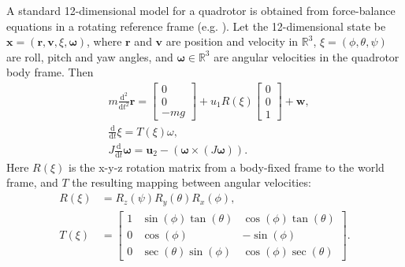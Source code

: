 \documentclass[conference]{IEEEtran}
\begin{document}
A standard 12-dimensional model for a quadrotor is obtained from force-balance equations in a rotating reference frame (e.g. \cite{Mellinger2011,Zhou2014}). Let the 12-dimensional state be $\mathbf{x} = (\mathbf{r}, \mathbf{v}, \xi, \mathbf{\omega})$, where $\mathbf{r}$ and $\mathbf{v}$ are position and velocity in $\mathbb{R}^3$, $\xi = (\phi, \theta, \psi)$ are roll, pitch and yaw angles, and $\mathbf{\omega} \in \mathbb{R}^3$ are angular velocities in the quadrotor body frame. Then
\begin{equation}
\label{eq:quadrotor_dyn}
\begin{aligned}
  & m \frac{\mathrm{d}^2}{\mathrm{d}t^2} \mathbf{r} = \begin{bmatrix}
    0 \\ 0 \\ -m g
  \end{bmatrix} + u_1 R(\xi) \begin{bmatrix}
    0 \\ 0 \\ 1
  \end{bmatrix} + \mathbf{w}, \\
  & \frac{\mathrm{d}}{\mathrm{d}t} \xi
   = T(\xi) \omega, \\
  & J \frac{\mathrm{d}}{\mathrm{d}t} \mathbf{\omega} = \mathbf{u}_2 - (\mathbf{\omega} \times (J \mathbf{\omega})).
\end{aligned}
\end{equation}
Here $R(\xi)$ is the x-y-z rotation matrix from a body-fixed frame to the world frame, and $T$ the resulting mapping between angular velocities:
\begin{equation}
\label{eq:rotmat}
\begin{aligned}
  R(\xi) & = R_z(\psi) R_y(\theta) R_x(\phi), \\
   T(\xi) & = \begin{bmatrix}
     1 & \sin(\phi)\tan(\theta) & \cos(\phi)\tan(\theta) \\
     0 & \cos(\phi)   &  -\sin(\phi) \\
     0 & \sec(\theta)\sin(\phi)  & \cos(\phi)\sec(\theta)
  \end{bmatrix}.
\end{aligned}
\end{equation}
\end{document}
